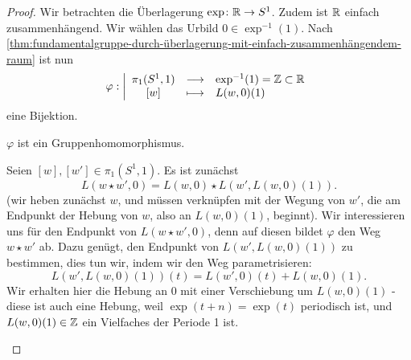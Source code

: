 \begin{proof}
    Wir betrachten die Überlagerung $\exp \colon  \mathbb{R} \to  S^1$. Zudem ist $\mathbb{R}$ einfach zusammenhängend. Wir wählen das Urbild $0\in \exp ^{-1}(1)$. Nach \autoref{thm:fundamentalgruppe-durch-überlagerung-mit-einfach-zusammenhängendem-raum} ist nun
        \begin{equation*}
        \varphi : \left| \begin{array}{c c l} 
            \pi_1(S^1,1) & \longrightarrow & \exp ^{-1}(1) = \mathbb{Z} \subset \mathbb{R} \\
            \left[w\right] & \longmapsto &  L(w,0)(1)
        \end{array} \right.
    \end{equation*}
    eine Bijektion.
    \begin{claim}
        $\varphi $ ist ein Gruppenhomomorphismus.
    \end{claim}
    \begin{subproof}
    Seien $[w],[w'] \in \pi_1(S^1,1)$. Es ist zunächst
    \[
        L(w\star w', 0) = L(w,0) \star L(w',L(w,0)(1))
    .\]
    (wir heben zunächst $w$, und müssen verknüpfen mit der Wegung von  $w'$, die am Endpunkt der Hebung von  $w$, also an  $L(w,0)(1)$, beginnt). Wir interessieren uns für den Endpunkt von $L(w\star w',0)$, denn auf diesen bildet  $\varphi $ den Weg $w \star w'$ ab. Dazu genügt, den Endpunkt von  $L(w', L(w,0)(1))$ zu bestimmen, dies tun wir, indem wir den Weg parametrisieren:
    \[
        L(w',L(w,0)(1))(t) = L(w',0)(t) + L(w,0)(1)
    .\] 
    Wir erhalten hier die Hebung an $0$ mit einer Verschiebung um  $L(w,0)(1)$ - diese ist auch eine Hebung, weil  $\exp (t+n) = \exp (t)$ periodisch ist, und $L(w,0)(1)\in \mathbb{Z}$ ein Vielfaches der Periode 1 ist.


\end{subproof}
\end{proof}
